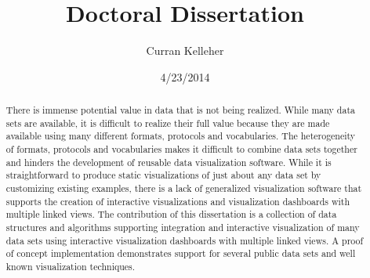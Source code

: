 \documentclass[12pt]{report}
\title{Doctoral Dissertation}
\author{Curran Kelleher}
\date{4/23/2014}
\begin{document}
\maketitle 

\begin{onehalfspacing}
\begin{abstract}
There is immense potential value in data that is not being realized. While many data sets are available, it is difficult to realize their full value because they are made available using many different formats, protocols and vocabularies. The heterogeneity of formats, protocols and vocabularies makes it difficult to combine data sets together and hinders the development of reusable data visualization software. While it is straightforward to produce static visualizations of just about any data set by customizing existing examples, there is a lack of generalized visualization software that supports the creation of interactive visualizations and visualization dashboards with multiple linked views. The contribution of this dissertation is a collection of data structures and algorithms supporting integration and interactive visualization of many data sets using interactive visualization dashboards with multiple linked views. A proof of concept implementation demonstrates support for several public data sets and well known visualization techniques.
\end{abstract}
\end{onehalfspacing}

\pagebreak

\tableofcontents

\pagebreak
\end{document}
